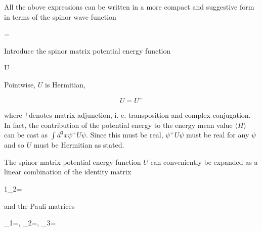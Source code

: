 \documentclass{article}
\begin{document}
All the above expressions can be written in a more compact and suggestive form in terms of the spinor wave function
 
\psi=
 

Introduce the spinor matrix potential energy function
 
U=
 

Pointwise, $U$ is Hermitian,
 
\begin{equation*}
U=U^{+} \tag{3.21.21}
\end{equation*}
 
where ${ }^{+}$denotes matrix adjunction, i. e. transposition and complex conjugation. In fact, the contribution of the potential energy to the energy mean value $\langle H\rangle$ can be cast as $\int d^{3} x \psi^{+} U \psi$. Since this must be real, $\psi^{+} U \psi$ must be real for any $\psi$ and so $U$ must be Hermitian as stated.

The spinor matrix potential energy function $U$ can conveniently be expanded
as a linear combination of the identity matrix
 
1_{2}=
 
and the Pauli matrices
 
\sigma_{1}=, \quad \sigma_{2}=\left[\begin{array}{rr}
0 & -i \\
i & 0
\end{array}\right], \quad \sigma_{3}=\left[\begin{array}{rr}
1 & 0 \\
0 & -1
\end{array}\right]
 
\end{document}
